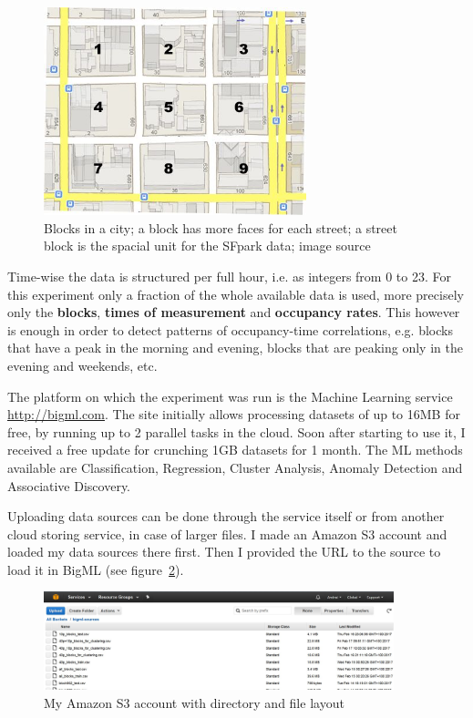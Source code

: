\documentclass{article}
\begin{document}
\begin{figure}[!ht]
    \centering
    \includegraphics[width=3.0in]{blocks.jpg}
    \caption{Blocks in a city; a block has more faces for each street; a street block is the spacial unit for the SFpark data; image source\cite{blocks_source}}
    \label{fig:blocks}
\end{figure}

Time-wise the data is structured per full hour, i.e. as integers from 0 to 23. For this experiment only a fraction of the whole available data is used, more precisely only the \textbf{blocks}, \textbf{times of measurement} and \textbf{occupancy rates}. This however is enough in order to detect patterns of occupancy-time correlations, e.g. blocks that have a peak in the morning and evening, blocks that are peaking only in the evening and weekends, etc.
\vspace{2mm}

The platform on which the experiment was run is the Machine Learning service \url{http://bigml.com}. The site initially allows processing datasets of up to 16MB for free, by running up to 2 parallel tasks in the cloud. Soon after starting to use it, I received a free update for crunching 1GB datasets for 1 month. The ML methods available are Classification, Regression, Cluster Analysis, Anomaly Detection and Associative Discovery.
\vspace{2mm}

Uploading data sources can be done through the service itself or from another cloud storing service, in case of larger files. I made an Amazon S3 account and loaded my data sources there first. Then I provided the URL to the source to load it in BigML (see figure~\ref{fig:amazon_s3}).

\begin{figure}[!ht]
    \centering
    \includegraphics[width=4.0in]{amazon_s3.jpg}
    \caption{My Amazon S3 account with directory and file layout}
    \label{fig:amazon_s3}
\end{figure}
\end{document}
